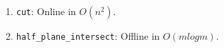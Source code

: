 \begin{enumerate}
\item \texttt{cut}: Online in $O(n^2)$.
\item \texttt{half\_plane\_intersect}: Offline in $O(mlogm)$.
\end{enumerate}

